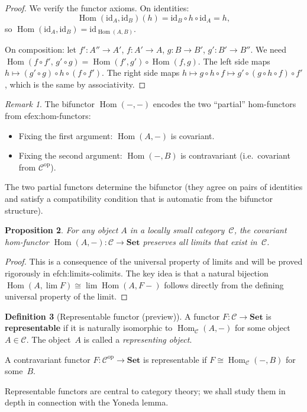 \documentclass[a4paper,12pt]{book}
\DeclareMathOperator{\Hom}{Hom}
\newcommand{\Set}{\mathbf{Set}}
\newcommand{\op}{\mathrm{op}}
\newcommand{\id}{\mathrm{id}}
\theoremstyle{definition}
\newtheorem{definition}{Definition}[section]
\theoremstyle{plain}
\newtheorem{proposition}[definition]{Proposition}
\theoremstyle{remark}
\newtheorem{remark}[definition]{Remark}
\begin{document}
\begin{proof}
We verify the functor axioms.  On identities:
\[
    \Hom(\id_A,\id_B)(h) = \id_B\circ h\circ\id_A = h,
\]
so $\Hom(\id_A,\id_B) = \id_{\Hom(A,B)}$.

On composition: let $f'\colon A''\to A'$, $f\colon A'\to A$,
$g\colon B\to B'$, $g'\colon B'\to B''$.
We need
$\Hom(f\circ f',\,g'\circ g) = \Hom(f',g')\circ\Hom(f,g)$.
The left side maps $h\mapsto (g'\circ g)\circ h\circ(f\circ f')$.
The right side maps
$h\mapsto g\circ h\circ f\mapsto g'\circ(g\circ h\circ f)\circ f'$,
which is the same by associativity.
\end{proof}

\begin{remark}\label{rem:hom-functor-partial-functors}
The bifunctor $\Hom(-,-)$ encodes the two ``partial'' hom-functors
from 
ef{ex:hom-functors}:
\begin{itemize}
    \item Fixing the first argument: $\Hom(A,-)$ is covariant.
    \item Fixing the second argument: $\Hom(-,B)$ is contravariant
          (i.e.\ covariant from $\mathcal{C}^{\op}$).
\end{itemize}
The two partial functors determine the bifunctor (they agree on pairs
of identities and satisfy a compatibility condition that is automatic
from the bifunctor structure).
\end{remark}

\begin{proposition}\label{prop:hom-preserves-limits}
For any object $A$ in a locally small category~$\mathcal{C}$, the
covariant hom-functor $\Hom(A,-)\colon\mathcal{C}\to\Set$ preserves
all limits that exist in~$\mathcal{C}$.
\end{proposition}

\begin{proof}
This is a consequence of the universal property of limits and will be
proved rigorously in 
ef{ch:limits-colimits}.  The key idea is that a
natural bijection $\Hom(A,\lim F)\cong\lim\Hom(A,F-)$ follows directly
from the defining universal property of the limit.
\end{proof}

\begin{definition}[Representable functor (preview)]\label{def:representable-preview}
A functor $F\colon\mathcal{C}\to\Set$ is \textbf{representable} if it
is naturally isomorphic to $\Hom_\mathcal{C}(A,-)$ for some object
$A\in\mathcal{C}$.  The object~$A$ is called a \emph{representing
object}.

A contravariant functor $F\colon\mathcal{C}^{\op}\to\Set$ is
representable if $F\cong\Hom_\mathcal{C}(-,B)$ for some~$B$.

Representable functors are central to category theory; we shall study
them in depth in connection with the Yoneda lemma.
\end{definition}
\end{document}
